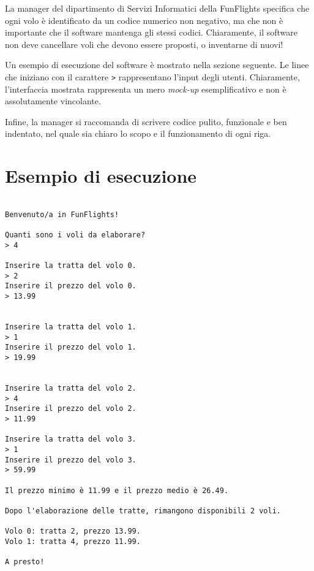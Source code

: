 \documentclass[a4paper, 11pt]{exam}
\begin{document}
La manager del dipartimento di Servizi Informatici della FunFlights specifica che ogni volo è identificato da un codice numerico non negativo, ma che non è importante che il software mantenga gli stessi codici. 
Chiaramente, il software non deve cancellare voli che devono essere proposti, o inventarne di nuovi!

Un esempio di esecuzione del software è mostrato nella sezione seguente. 
Le linee che iniziano con il carattere \texttt{>} rappresentano l'input degli utenti.
Chiaramente, l'interfaccia mostrata rappresenta un mero \textit{mock-up} esemplificativo e non è assolutamente vincolante. 

Infine, la manager si raccomanda di scrivere codice pulito, funzionale e ben indentato, nel quale sia chiaro lo scopo e il funzionamento di ogni riga.
\pagebreak
\maketitle
\section*{Esempio di esecuzione}

\begin{verbatim}

Benvenuto/a in FunFlights! 

Quanti sono i voli da elaborare?
> 4

Inserire la tratta del volo 0.
> 2
Inserire il prezzo del volo 0.
> 13.99


Inserire la tratta del volo 1.
> 1
Inserire il prezzo del volo 1.
> 19.99


Inserire la tratta del volo 2.
> 4
Inserire il prezzo del volo 2.
> 11.99

Inserire la tratta del volo 3.
> 1
Inserire il prezzo del volo 3.
> 59.99

Il prezzo minimo è 11.99 e il prezzo medio è 26.49.

Dopo l'elaborazione delle tratte, rimangono disponibili 2 voli.

Volo 0: tratta 2, prezzo 13.99.
Volo 1: tratta 4, prezzo 11.99.

A presto!
\end{verbatim}
\end{document}

